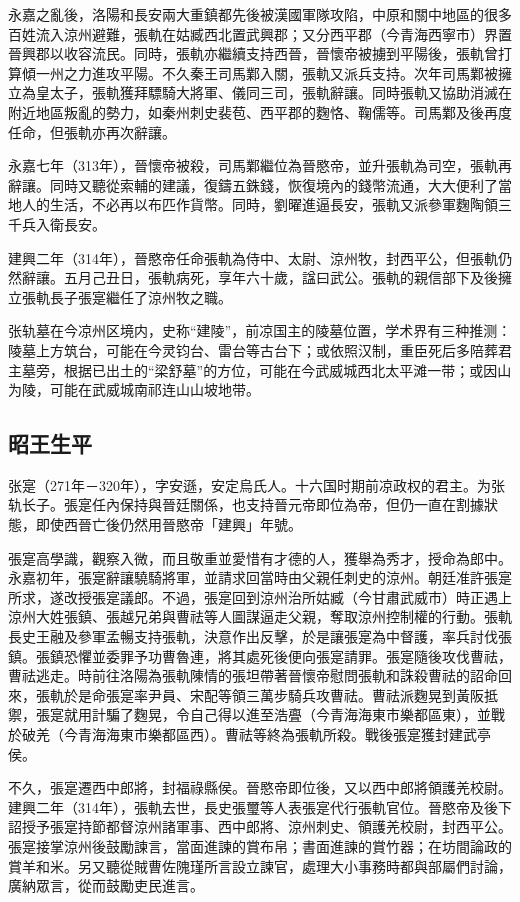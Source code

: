 永嘉之亂後，洛陽和長安兩大重鎮都先後被漢國軍隊攻陷，中原和關中地區的很多百姓流入涼州避難，張軌在姑臧西北置武興郡；又分西平郡（今青海西寧市）界置晉興郡以收容流民。同時，張軌亦繼續支持西晉，晉懷帝被擄到平陽後，張軌曾打算傾一州之力進攻平陽。不久秦王司馬鄴入關，張軌又派兵支持。次年司馬鄴被擁立為皇太子，張軌獲拜驃騎大將軍、儀同三司，張軌辭讓。同時張軌又協助消滅在附近地區叛亂的勢力，如秦州刺史裴苞、西平郡的麴恪、鞠儒等。司馬鄴及後再度任命，但張軌亦再次辭讓。

永嘉七年（313年），晉懷帝被殺，司馬鄴繼位為晉愍帝，並升張軌為司空，張軌再辭讓。同時又聽從索輔的建議，復鑄五銖錢，恢復境內的錢幣流通，大大便利了當地人的生活，不必再以布匹作貨幣。同時，劉曜進逼長安，張軌又派參軍麴陶領三千兵入衛長安。

建興二年（314年），晉愍帝任命張軌為侍中、太尉、涼州牧，封西平公，但張軌仍然辭讓。五月己丑日，張軌病死，享年六十歲，諡曰武公。張軌的親信部下及後擁立張軌長子張寔繼任了涼州牧之職。

张轨墓在今凉州区境内，史称“建陵”，前凉国主的陵墓位置，学术界有三种推测：陵墓上方筑台，可能在今灵钧台、雷台等古台下；或依照汉制，重臣死后多陪葬君主墓旁，根据已出土的“梁舒墓”的方位，可能在今武威城西北太平滩一带；或因山为陵，可能在武威城南祁连山山坡地带。

\subsection{昭王生平}

张寔（271年－320年），字安遜，安定烏氏人。十六国时期前凉政权的君主。为张轨长子。張寔任內保持與晉廷關係，也支持晉元帝即位為帝，但仍一直在割據狀態，即使西晉亡後仍然用晉愍帝「建興」年號。

張寔高學識，觀察入微，而且敬重並愛惜有才德的人，獲舉為秀才，授命為郎中。永嘉初年，張寔辭讓驍騎將軍，並請求回當時由父親任刺史的涼州。朝廷准許張寔所求，遂改授張寔議郎。不過，張寔回到涼州治所姑臧（今甘肅武威市）時正遇上涼州大姓張鎮、張越兄弟與曹祛等人圖謀逼走父親，奪取涼州控制權的行動。張軌長史王融及參軍孟暢支持張軌，決意作出反擊，於是讓張寔為中督護，率兵討伐張鎮。張鎮恐懼並委罪予功曹魯連，將其處死後便向張寔請罪。張寔隨後攻伐曹祛，曹祛逃走。時前往洛陽為張軌陳情的張坦帶著晉懷帝慰問張軌和誅殺曹祛的詔命回來，張軌於是命張寔率尹員、宋配等領三萬步騎兵攻曹祛。曹祛派麴晃到黃阪抵禦，張寔就用計騙了麴晃，令自己得以進至浩亹（今青海海東市樂都區東），並戰於破羌（今青海海東市樂都區西）。曹祛等終為張軌所殺。戰後張寔獲封建武亭侯。

不久，張寔遷西中郎將，封福祿縣侯。晉愍帝即位後，又以西中郎將領護羌校尉。建興二年（314年），張軌去世，長史張璽等人表張寔代行張軌官位。晉愍帝及後下詔授予張寔持節都督涼州諸軍事、西中郎將、涼州刺史、領護羌校尉，封西平公。張寔接掌涼州後鼓勵諫言，當面進諫的賞布帛；書面進諫的賞竹器；在坊間論政的賞羊和米。另又聽從賊曹佐隗瑾所言設立諫官，處理大小事務時都與部屬們討論，廣納眾言，從而鼓勵吏民進言。

